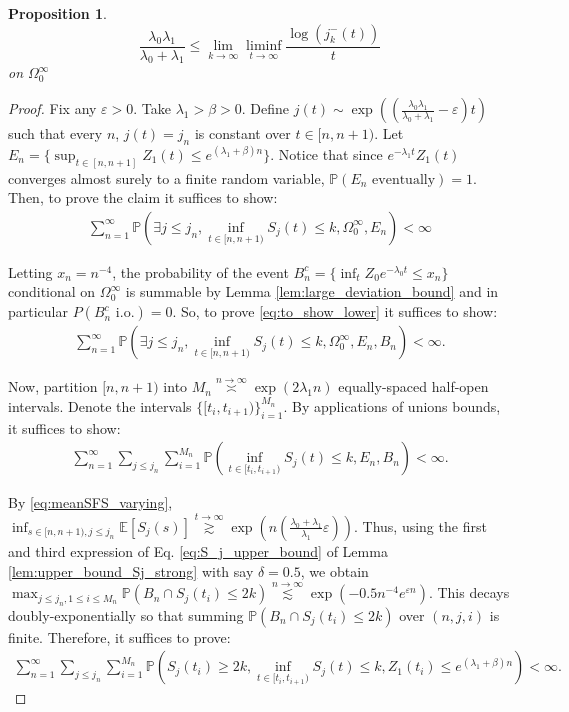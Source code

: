 \documentclass{article}
\numberwithin{equation}{section}
\newtheorem{proposition}{Proposition}
\newcommand{\gsimas}[2]{\overset{{#1}\to {#2}}{\gtrsim}}
\newcommand{\lsimas}[2]{\overset{{#1}\to {#2}}{\lesssim}}
\newcommand{\ordas}[2]{\overset{{#1}\to {#2}}{\asymp}}
\begin{document}
\begin{proposition}\label{prop:liminf_j_k_mimus}
  \[\frac{\lambda_0\lambda_1}{\lambda_0+\lambda_1}\leq \lim_{k\to\infty}\liminf_{t\to\infty}\frac{\log(j_k^-(t))}{t}\]
  on $\Omega_0^\infty$
\end{proposition}
\begin{proof}
Fix any $\varepsilon>0$. Take $\lambda_1>\beta>0$. Define $j(t)\sim \exp\left((\frac{\lambda_0\lambda_1}{\lambda_0+\lambda_1}-\varepsilon)t\right)$ such that every $n$, $j(t)=j_n$ is constant over $t\in [n,n+1)$. Let $E_n=\{\sup_{t\in [n,n+1]}Z_1(t)\leq e^{(\lambda_1+\beta)n}\}$. Notice that since $e^{-\lambda_1 t}Z_1(t)$ converges almost surely to a finite random variable, $\mathbb{P}(E_n\text{ eventually})=1$. Then, to prove the claim it suffices to show:
  \begin{align}
    \sum_{n=1}^\infty \mathbb{P}\left(\exists j\leq j_n,\inf_{t\in [n,n+1)}S_{j}(t)\leq k,\Omega_0^\infty,E_n\right)<\infty\label{eq:to_show_lower}
  \end{align}

  Letting $x_n=n^{-4}$, the probability of the event $B_n^c=\{\inf_{t}Z_0e^{-\lambda_0 t}\leq x_n\}$ conditional on $\Omega_0^\infty$ is summable by Lemma \ref{lem:large_deviation_bound} and in particular $P(B_n^c\text{ i.o.})=0$. So, to prove \ref{eq:to_show_lower} it suffices to show:
\begin{align*}
    \sum_{n=1}^\infty \mathbb{P}\left(\exists j\leq j_n,\inf_{t\in [n,n+1)}S_{j}(t)\leq k,\Omega_0^\infty,E_n,B_n\right)<\infty.
  \end{align*}

  Now, partition $[n,n+1)$ into $M_n\ordas{n}{\infty}\exp(2\lambda_1 n)$ equally-spaced half-open intervals. Denote the intervals $\{[t_i,t_{i+1})\}_{i=1}^{M_n}$. By applications of unions bounds, it suffices to show:
  \begin{align*}
      \sum_{n=1}^\infty\sum_{j\leq j_n}\sum_{i=1}^{M_n} \mathbb{P}\left(\inf_{t\in [t_i,t_{i+1})}S_{j}(t)\leq k,E_n,B_n\right)<\infty.
  \end{align*}

  By \ref{eq:meanSFS_varying}, $\inf_{s\in [n,n+1),j\leq j_n}\mathbb{E}[S_{j}(s)]\gsimas{t}{\infty}\exp\left(n\left(\frac{\lambda_0+\lambda_1}{\lambda_1}\varepsilon\right)\right)$. Thus, using the first and third expression of Eq. \ref{eq:S_j_upper_bound} of Lemma \ref{lem:upper_bound_Sj_strong} with say $\delta=0.5$, we obtain $\max_{j\leq j_n,1\leq i\leq M_n}\mathbb{P}(B_n\cap S_j(t_i)\leq 2k)\lsimas{n}{\infty}\exp\left(-0.5n^{-4}e^{\varepsilon n}\right)$. This decays doubly-exponentially so that summing $\mathbb{P}(B_n\cap S_j(t_i)\leq 2k)$ over $(n,j,i)$ is finite. Therefore, it suffices to prove:
  \begin{align*}
      \sum_{n=1}^\infty\sum_{j\leq j_n}\sum_{i=1}^{M_n} \mathbb{P}\left(S_j(t_i)\geq 2k,\inf_{t\in [t_i,t_{i+1})}S_{j}(t)\leq k,Z_1(t_i)\leq e^{(\lambda_1+\beta)n}\right)<\infty.
  \end{align*}


\end{proof}
\end{document}
